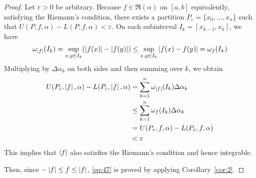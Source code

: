 \documentclass[thmcnt=section, color=blue, 12pt]{my-elegantbook}
\begin{document}
\begin{proof}
	Let $\varepsilon > 0$ be arbitrary.
	Because $f \in \mathfrak{R}(\alpha)$ on $[a, b]$
	equivalently, satisfying the Riemann's condition,
	there exists a partition $P_\varepsilon = \{x_0, \ldots, x_n\}$
	such that $U(P, f, \alpha) - L(P, f, \alpha) < \varepsilon$.
	On each subinterval $I_k = [x_{k-1}, x_k]$, we have
	\begin{align*}
		\omega_{\left\lvert f \right\rvert}(I_k)
		= \sup_{x, y \in I_k} ( \left\lvert f(x) \right\rvert - \left\lvert f(y) \right\rvert )
		\leq \sup_{x, y \in I_k} \left\lvert  f(x) - f(y)  \right\rvert
		= \omega_f(I_k)
	\end{align*}
	Multiplying by $\Delta \alpha_k$ on both sides and then summing over $k$,
	we obtain
	\begin{align*}
		U(P_\varepsilon, \left\lvert f \right\rvert, \alpha) - L(P_\varepsilon, \left\lvert f \right\rvert, \alpha)
		 & = \sum_{k=1}^n \omega_{\left\lvert f \right\rvert}(I_k) \Delta \alpha_k        \\
		 & \leq \sum_{k=1}^n \omega_{f}(I_k) \Delta \alpha_k           \\
		 & = U(P_\varepsilon, f, \alpha) - L(P_\varepsilon, f, \alpha) \\
		 & < \varepsilon
	\end{align*}
	This implies that $\left\lvert f \right\rvert$ also satisfies the Riemann's condition
	and hence integrable.

	Then, since $-\left\lvert f \right\rvert \leq f \leq \left\lvert f \right\rvert$, \eqref{eq:47}
	is proved by applying Corollary~\ref{cor:2}.
\end{proof}


\printbibliography[heading=bibintoc, title=References]


\printindex
\end{document}
